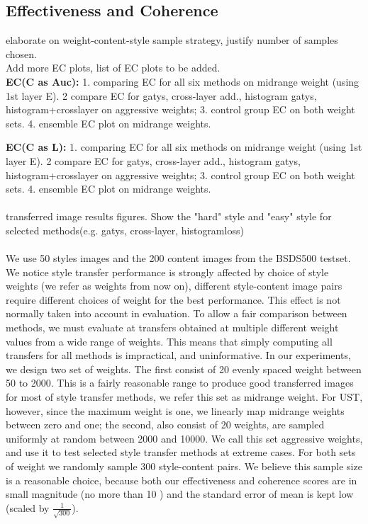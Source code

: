 \documentclass[runningheads]{llncs}
\begin{document}
\subsection{Effectiveness and Coherence}\label{ecplot}
\todo elaborate on weight-content-style sample strategy, justify number of samples chosen.  \\
\todo Add more EC plots, list of EC plots to be added. \\
\textbf{EC(C as Auc):} 1. comparing EC for all six methods on midrange weight (using 1st layer E). 2 compare EC  for gatys, cross-layer add., histogram gatys, histogram+crosslayer on aggressive weights; 3.  control group EC on both weight sets. 4. ensemble EC plot on midrange weights.

\noindent \textbf{EC(C as L):} 1. comparing EC for all six methods on midrange weight (using 1st layer E). 2 compare EC  for gatys, cross-layer add., histogram gatys, histogram+crosslayer on aggressive weights; 3.  control group EC on both weight sets. 4. ensemble EC plot on midrange weights.\\\\

\noindent \todo transferred image results figures. Show the "hard" style and "easy" style for selected methods(e.g. gatys, cross-layer, histogramloss)\\\\

We use 50 styles images and the 200 content  images from the BSDS500  testset. We notice  style transfer performance is strongly affected by choice of
style weights (we refer as weights from now on),  different style-content image pairs require different choices of  weight for the best performance.  This effect is not
normally taken into account in evaluation.  To allow a fair comparison between methods, we must evaluate at 
transfers obtained at multiple different weight values from a wide range of weights.  This means that simply computing
all transfers for all methods is impractical, and uninformative.  In our experiments, we design two set of weights. The first consist of 20 evenly spaced weight between 50 to 2000.  This is a fairly reasonable range to produce good transferred images for most of style transfer methods, we refer this set as midrange weight. For UST, however, since the maximum weight is one, we linearly map midrange weights between zero and one; the second, also consist of 20 weights, are sampled uniformly at random between 2000 and 10000.  We call this set aggressive weights, and use it to test selected style transfer methods at extreme cases.  For both sets of weight we randomly sample 300 style-content pairs. We believe this sample size is a reasonable choice,  because both our effectiveness and coherence scores are in small magnitude (no more than 10 ) and the standard error of mean is kept low (scaled by $\frac{1}{\sqrt{300}}$).   
\end{document}

